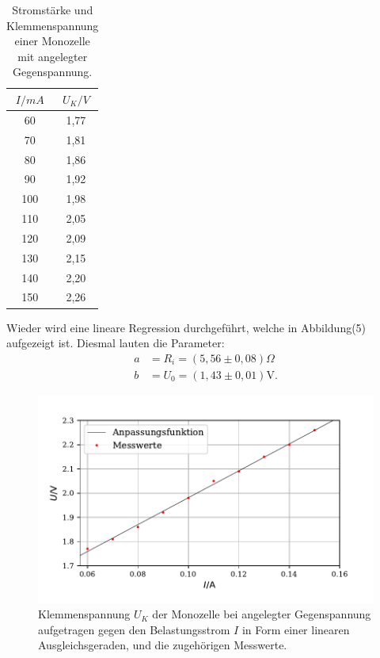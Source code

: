 \begin{table}[H]
  \centering
  \caption{Stromstärke und Klemmenspannung einer Monozelle mit angelegter Gegenspannung.}
  \begin{tabular}{c c}
    \toprule
     $I/mA$ & $U_K/V$  \\
    \midrule
    60 & 1,77\\
    70 & 1,81\\
    80 & 1,86\\
    90 & 1,92\\
    100 & 1,98\\
    110 & 2,05\\
    120 & 2,09\\
    130 & 2,15\\
    140 & 2,20\\
    150 & 2,26\\
   
  \bottomrule
  \end{tabular}
\end{table}

\noindent Wieder wird eine lineare Regression durchgeführt, welche in Abbildung(5) aufgezeigt ist. Diesmal lauten die Parameter:
\begin{align*}
a &= R_i = (5,56 \pm 0,08)\Omega \\
b &= U_0 =  (1,43 \pm 0,01)\si{\volt} .
\end{align*}

\begin{figure}[H]
  \centering
  \includegraphics{plot2.pdf}
  \caption{Klemmenspannung $U_K$ der Monozelle bei angelegter Gegenspannung aufgetragen gegen den Belastungsstrom $I$ in Form einer linearen Ausgleichsgeraden, und die zugehörigen Messwerte.}
  \label{fig:rechteck}
\end{figure}

